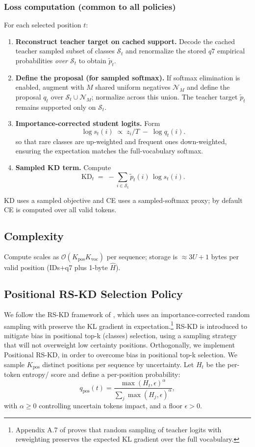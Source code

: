 \documentclass[11pt]{article}
\begin{document}
\subsubsection{Loss computation (common to all policies)}
For each selected position $t$:
\begin{enumerate}
	\item \textbf{Reconstruct teacher target on cached support.} Decode the cached teacher sampled subset of classes $\mathcal{S}_t$ and renormalize the stored $q7$ empirical probabilities \emph{over $\mathcal{S}_t$} to obtain $\tilde p_t$.
	\item \textbf{Define the proposal (for sampled softmax).} If softmax elimination is enabled, augment with $M$ shared uniform negatives $\mathcal{N}_M$ and define the proposal $q_t$ over $\mathcal{S}_t\cup\mathcal{N}_M$; normalize across this union. The teacher target $\tilde p_t$ remains supported only on $\mathcal{S}_t$.
	\item \textbf{Importance-corrected student logits.} Form
	      \[
		      \log s_t(i)\;\propto\; z_i/T \;-\; \log q_t(i).
	      \]
	      so that rare classes are up-weighted and frequent ones down-weighted,
	      ensuring the expectation matches the full-vocabulary softmax.
	\item \textbf{Sampled KD term.} Compute
	      \[
		      \mathrm{KD}_t \;=\; -\!\sum_{i\in\mathcal{S}_t} \tilde p_t(i)\,\log s_t(i).
	      \]
\end{enumerate}
KD uses a sampled objective and CE uses a sampled-softmax proxy; by default CE is computed over all valid tokens.

\subsection{Complexity}
Compute scales as $\mathcal{O}(K_{\text{pos}}K_{\text{voc}})$ per sequence; storage is $\approx 3U + 1$ bytes per valid position (IDs+q7 plus 1-byte $\hat H$).

\subsection{Positional RS-KD Selection Policy}
We follow the RS-KD framework of \citet{anshumann2025sparse}, which uses an importance-corrected random sampling with preserve the KL gradient in expectation.\footnote{Appendix A.7 of \citet{anshumann2025sparse} proves that random sampling of teacher logits with reweighting preserves the expected KL gradient over the full vocabulary.}
RS-KD is introduced to mitigate bias in positional top-k (classes) selection, using a sampling strategy that will not overweight low certainty positions. Orthogonally, we implement Positional RS-KD, in order to overcome bias in positional top-k selection. We sample $K_{\text{pos}}$ distinct positions per sequence by uncertainty. Let $H_t$ be the per-token entropy/ score and define a per-position probability:
\[
	q_{\text{pos}}(t)=\frac{\max(H_t,\epsilon)^{\alpha}}{\sum_j \max(H_j,\epsilon)^{\alpha}},
\]
with $\alpha\ge0$ controlling uncertain tokens impact, and a floor $\epsilon>0$.
\end{document}
